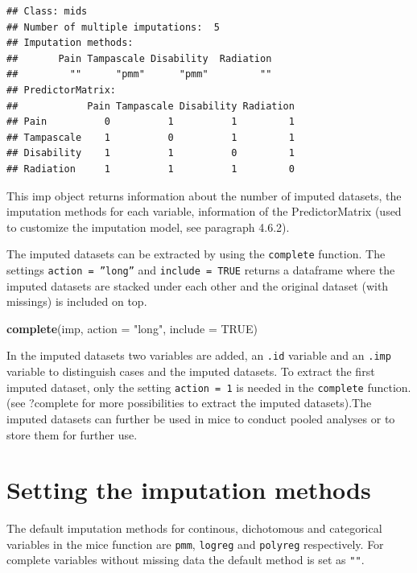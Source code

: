 \documentclass[
]{book}
\newenvironment{Shaded}{\begin{snugshade}}{\end{snugshade}}
\newcommand{\DataTypeTok}[1]{\textcolor[rgb]{0.13,0.29,0.53}{#1}}
\newcommand{\KeywordTok}[1]{\textcolor[rgb]{0.13,0.29,0.53}{\textbf{#1}}}
\newcommand{\NormalTok}[1]{#1}
\newcommand{\OtherTok}[1]{\textcolor[rgb]{0.56,0.35,0.01}{#1}}
\newcommand{\StringTok}[1]{\textcolor[rgb]{0.31,0.60,0.02}{#1}}
\begin{document}
\begin{verbatim}
## Class: mids
## Number of multiple imputations:  5 
## Imputation methods:
##       Pain Tampascale Disability  Radiation 
##         ""      "pmm"      "pmm"         "" 
## PredictorMatrix:
##            Pain Tampascale Disability Radiation
## Pain          0          1          1         1
## Tampascale    1          0          1         1
## Disability    1          1          0         1
## Radiation     1          1          1         0
\end{verbatim}

This imp object returns information about the number of imputed
datasets, the imputation methods for each variable, information of the
PredictorMatrix (used to customize the imputation model, see paragraph
4.6.2).

The imputed datasets can be extracted by using the \texttt{complete}
function. The settings \texttt{action\ =\ ”long”} and
\texttt{include\ =\ TRUE} returns a dataframe where the imputed datasets
are stacked under each other and the original dataset (with missings) is
included on top.

\begin{Shaded}
\begin{Highlighting}[]
\KeywordTok{complete}\NormalTok{(imp, }\DataTypeTok{action =} \StringTok{"long"}\NormalTok{, }\DataTypeTok{include =} \OtherTok{TRUE}\NormalTok{)}
\end{Highlighting}
\end{Shaded}

In the imputed datasets two variables are added, an \texttt{.id}
variable and an \texttt{.imp} variable to distinguish cases and the
imputed datasets. To extract the first imputed dataset, only the setting
\texttt{action\ =\ 1} is needed in the \texttt{complete} function. (see
?complete for more possibilities to extract the imputed datasets).The
imputed datasets can further be used in mice to conduct pooled analyses
or to store them for further use.

\hypertarget{setting-the-imputation-methods}{%
\section{Setting the imputation
methods}\label{setting-the-imputation-methods}}

The default imputation methods for continous, dichotomous and
categorical variables in the mice function are \texttt{pmm},
\texttt{logreg} and \texttt{polyreg} respectively. For complete
variables without missing data the default method is set as \texttt{""}.
\end{document}
